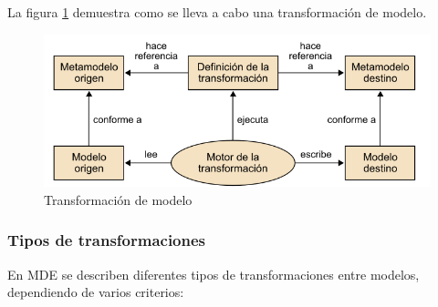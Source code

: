 {La figura \ref{fig:Transformación de modelo} demuestra como se lleva a cabo una transformación de modelo.

\begin{figure}[!h] 
	\begin{center}
		\includegraphics [scale=0.50]{imagenes/Transformacion_modelo.png}
	\end{center}
	\caption{Transformación de modelo}
	\label{fig:Transformación de modelo}
\end{figure} 

\subsubsection*{Tipos de transformaciones}
\label{Tipos de transformaciones}

En MDE se describen diferentes tipos de transformaciones entre modelos, dependiendo de varios criterios:

}
